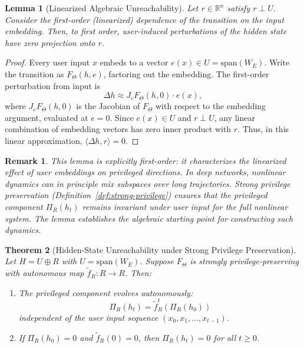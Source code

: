 \documentclass[11pt,a4paper]{article}
\newtheorem{theorem}{Theorem}[section]
\newtheorem{lemma}[theorem]{Lemma}
\newtheorem*{remark}{Remark}
\begin{document}
\begin{lemma}[Linearized Algebraic Unreachability]
\label{lem:linearized}
Let $r \in \mathbb{R}^n$ satisfy $r \perp U$. Consider the first-order (linearized) dependence of the transition on the input embedding. Then, to first order, user-induced perturbations of the hidden state have zero projection onto $r$.
\end{lemma}

\begin{proof}
Every user input $x$ embeds to a vector $e(x) \in U = \text{span}(W_E)$. Write the transition as $F_\Theta(h, e)$, factoring out the embedding. The first-order perturbation from input is
\[
\Delta h \approx J_e F_\Theta(h, 0) \cdot e(x),
\]
where $J_e F_\Theta(h, 0)$ is the Jacobian of $F_\Theta$ with respect to the embedding argument, evaluated at $e = 0$. Since $e(x) \in U$ and $r \perp U$, any linear combination of embedding vectors has zero inner product with $r$. Thus, in this linear approximation, $\langle \Delta h, r \rangle = 0$.
\end{proof}

\begin{remark}
This lemma is explicitly first-order: it characterizes the linearized effect of user embeddings on privileged directions. In deep networks, nonlinear dynamics can in principle mix subspaces over long trajectories. Strong privilege preservation (Definition~\ref{def:strong-privilege}) ensures that the privileged component $\Pi_R(h_t)$ remains invariant under user input for the full nonlinear system. The lemma establishes the algebraic starting point for constructing such dynamics.
\end{remark}

\begin{theorem}[Hidden-State Unreachability under Strong Privilege Preservation]
\label{thm:hidden-unreachability}
Let $H = U \oplus R$ with $U = \text{span}(W_E)$. Suppose $F_\Theta$ is strongly privilege-preserving with autonomous map $\tilde{f}_R: R \to R$. Then:
\begin{enumerate}
    \item The privileged component evolves autonomously:
    \[
    \Pi_R(h_t) = \tilde{f}_R^t(\Pi_R(h_0))
    \]
    independent of the user input sequence $(x_0, x_1, \ldots, x_{t-1})$.
    \item If $\Pi_R(h_0) = 0$ and $\tilde{f}_R(0) = 0$, then $\Pi_R(h_t) = 0$ for all $t \geq 0$.
\end{enumerate}
\end{theorem}
\end{document}
